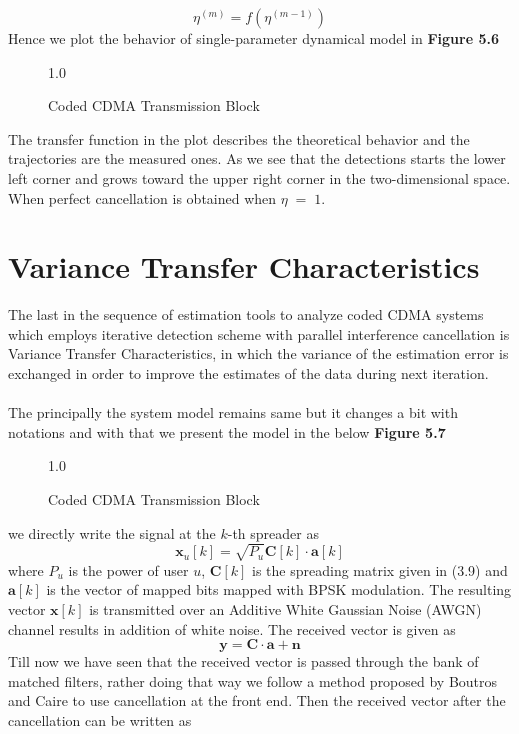 \begin{equation}
\eta^{(m)}=f\left(\eta^{(m-1)}\right)
\end{equation}
Hence we plot the behavior of single-parameter dynamical model in \textbf{Figure 5.6}
\begin{figure}[htb]
\centerline{  {1.0} }
\caption{Coded CDMA Transmission Block}
\end{figure}
The transfer function in the plot describes the theoretical behavior and the trajectories are the measured ones. As we see that the detections starts the lower left corner and grows toward the upper right corner in the two-dimensional space. When perfect cancellation is obtained when $\eta\;=\;1$.
\newpage
\section{Variance Transfer Characteristics}
The last in the sequence of estimation tools to analyze coded CDMA systems which employs iterative detection scheme with parallel interference cancellation is Variance Transfer Characteristics, in which the variance of the estimation error is exchanged in order to improve the estimates of the data during next iteration. \\ \\
The principally the system model remains same but it changes a bit with notations and with that we present the model in the below \textbf{Figure 5.7}
\begin{figure}[htb]
\centerline{  {1.0} }
\caption{Coded CDMA Transmission Block}
\end{figure}
we directly write the signal at the $k$-th spreader as
\begin{equation}
\mathrm{\mathbf{x}}_u[k]=\sqrt{P_u}\mathrm{\mathbf{C}}[k]\cdot\mathrm{\mathbf{a}}[k]
\end{equation}
where $P_u$ is the power of user $u$, $\mathrm{\mathbf{C}}[k]$ is the spreading matrix given in (3.9) and $\mathrm{\mathbf{a}}[k]$ is the vector of mapped bits mapped with BPSK modulation. The resulting vector $\mathrm{\mathbf{x}}[k]$ is transmitted over an Additive White Gaussian Noise (AWGN) channel results in addition of white noise. The received vector is given as
\begin{equation}
\mathrm{\mathbf{y}}=\mathrm{\mathbf{C}}\cdot\mathrm{\mathbf{a}}+\mathrm{\mathbf{n}}
\end{equation}
Till now we have seen that the received vector is passed through the bank of matched filters, rather doing that way we follow a method proposed by Boutros and Caire to use cancellation at the front end. Then the received vector after the cancellation can be written as
